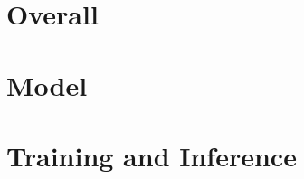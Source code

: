 \section{Overall}
\label{impl:overall}

\section{Model}
\label{impl:model}

\section{Training and Inference}
\label{impl:train}

